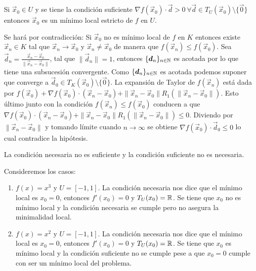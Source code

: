 \begin{teorema}\label{cso-sin-restricciones}
Si $\vec{x}_0 \in U$ y se tiene la condici\'on suficiente $\nabla f(\vec{x}_0)\cdot \vec{d} > 0 \:\forall \vec{d}\in T_U(\vec{x}_0)\setminus \{\vec{0}\}$ entonces $\vec{x}_0$ es un m\'inimo local estricto de $f$ en $U$.
\end{teorema}

\begin{demostracion}
Se har\'a por contradicci\'on: Si $\vec{x}_0$ no es m\'inimo local de $f$ en $K$ entonces existe $\vec{x}_n \in K$ tal que $\vec{x}_n \to \vec{x}_0$ y $\vec{x}_n \neq \vec{x}_0$ de manera que $f(\vec{x}_n) \leq f(\vec{x}_0)$. Sea $\vec{d}_n = \frac{\vec{x}_n-\vec{x}_0}{\|\vec{x}_n-\vec{x}_0\|}$, tal que $\|\vec{d}_n\|=1$, entonces $\{\boldsymbol{d}_n\}_{n\in \mathbb{N}}$ es acotada por lo que tiene una subsucesi\'on convergente. Como $\{\boldsymbol{d}_n\}_{n\in \mathbb{N}}$ es acotada podemos suponer que converge a $\vec{d}_0 \in T_K(\vec{x}_0)\setminus \{\vec{0}\}$.
La expansi\'on de Taylor de $f(\vec{x}_n)$ est\'a dada por $f(\vec{x}_0) +  \nabla f(\vec{x}_0)\cdot (\vec{x}_n-\vec{x}_0) + \|\vec{x}_n - \vec{x}_0\| R_1(\|\vec{x}_n - \vec{x}_0\|)$. Esto \'ultimo junto con la condici\'on $f(\vec{x}_n) \leq f(\vec{x}_0)$ conducen a que $ \nabla f(\vec{x}_0)\cdot (\vec{x}_n-\vec{x}_0) + \|\vec{x}_n - \vec{x}_0\| R_1(\|\vec{x}_n - \vec{x}_0\|) \leq 0$.
Diviendo por $\|\vec{x}_n - \vec{x}_0\|$ y tomando l\'imite cuando $n\to \infty$ se obtiene $ \nabla f(\vec{x}_0)\cdot \vec{d}_0 \leq 0$ lo cual contradice la hip\'otesis.
\end{demostracion}

\begin{nota}
La condici\'on necesaria no es suficiente y la condici\'on suficiente no es necesaria.
\end{nota}

\begin{ejemplo} Consideremos los casos:
\begin{enumerate}
\item $f(x)=x^3$ y $U=[-1,1]$. La condici\'on necesaria nos dice que el m\'inimo local es $x_0=0$, entonces $f'(x_0)=0$ y $T_U(x_0)=\mathbb{R}$. Se tiene que $x_0$ no es m\'inimo local y la condici\'on necesaria se cumple pero no asegura la minimalidad local.
\item $f(x)=x^2$ y $U=[-1,1]$. La condici\'on necesaria nos dice que el m\'inimo local es $x_0=0$, entonces $f'(x_0)=0$ y $T_U(x_0)=\mathbb{R}$. Se tiene que $x_0$ es m\'inimo local y la condici\'on suficiente no se cumple pese a que $x_0=0$ cumple con ser un m\'inimo local del problema.
\end{enumerate}
\end{ejemplo}

